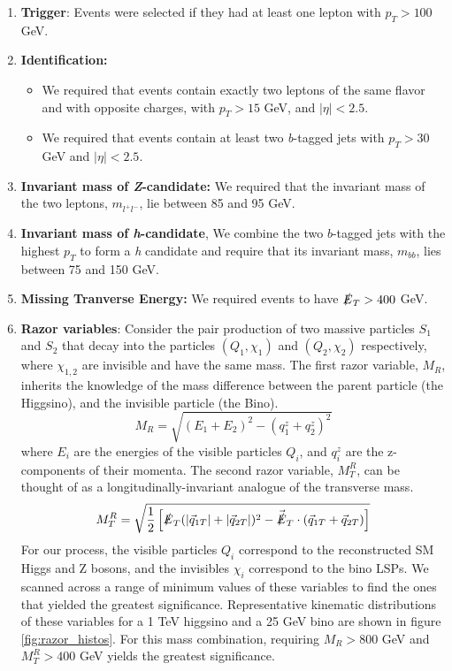 \begin{enumerate}
\item \textbf{Trigger}: Events were selected if they had at least one lepton with $p_{T} > 100$ GeV. 
\item \textbf{Identification:}
  \begin{itemize}
  \item We required that events contain exactly two leptons of the same flavor and with opposite charges, with $p_{T} > 15$ GeV, and $\vert\eta\vert < 2.5$.
  \item We required that events contain at least two \emph{b}-tagged jets with $p_{T} > 30$ GeV and $\vert\eta\vert < 2.5$.
  \end{itemize}
\item \textbf{Invariant mass of \emph{Z}-candidate:} We required that the invariant mass of the two leptons, $m_{l^{+}l^{-}}$, lie between 85 and 95 GeV.
\item \textbf{Invariant mass of \emph{h}-candidate}, We combine the two $b$-tagged jets with the highest $p_{T}$ to form a \emph{h} candidate and require that its invariant mass, $m_{bb}$, lies between 75 and 150 GeV.
\item \textbf{Missing Tranverse Energy:} We required events to have $\slashed{E}_T > 400$ GeV.
\item \textbf{Razor variables}: Consider the pair production of two massive particles $S_1$ and $S_2$ that decay into the particles $(Q_1, \chi_1)$ and $(Q_2, \chi_2)$ respectively, where $\chi_{1,2}$ are invisible and have the same mass. The first razor variable, $M_{R}$, inherits the knowledge of the mass difference between the parent particle (the Higgsino), and the invisible particle (the Bino).
\[M_R = \sqrt{(E_1+E_2)^2 - (q_1^z + q_2^z)^2}\]
where $E_i$ are the energies of the visible particles $Q_i$, and $q_i^z$ are the z-components of their momenta. 
The second razor variable, $M_{T}^{R}$, can be thought of as a longitudinally-invariant analogue of the transverse mass.
\[M_T^R = \sqrt{\frac{1}{2}\left[\slashed{E}_T(|\vec{q}_{1T}|+|\vec{q}_{2T}|)^2 - \vec{\slashed{E}}_T\cdot(\vec{q}_{1T}+\vec{q}_{2T})\right]}\]
For our process, the visible particles $Q_i$ correspond to the reconstructed SM Higgs and Z bosons, and the invisibles $\chi_i$ correspond to the bino LSPs. We scanned across a range of minimum values of these variables to find the ones that yielded the greatest significance. Representative kinematic distributions of these variables for a 1 TeV higgsino and a 25 GeV bino are shown in figure \ref{fig:razor_histos}.  For this mass combination, requiring $M_R > 800$ GeV and $M_T^R > 400$ GeV yields the greatest significance.

\end{enumerate}

